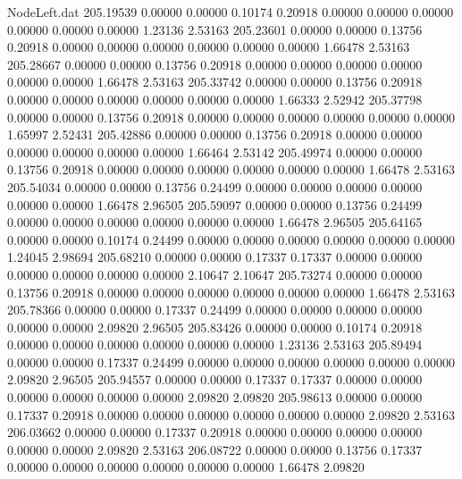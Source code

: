 \begin{filecontents}{NodeLeft.dat}
 205.19539    0.00000    0.00000     0.10174    0.20918    0.00000    0.00000    0.00000    0.00000    0.00000    0.00000    1.23136    2.53163
 205.23601    0.00000    0.00000     0.13756    0.20918    0.00000    0.00000    0.00000    0.00000    0.00000    0.00000    1.66478    2.53163
 205.28667    0.00000    0.00000     0.13756    0.20918    0.00000    0.00000    0.00000    0.00000    0.00000    0.00000    1.66478    2.53163
 205.33742    0.00000    0.00000     0.13756    0.20918    0.00000    0.00000    0.00000    0.00000    0.00000    0.00000    1.66333    2.52942
 205.37798    0.00000    0.00000     0.13756    0.20918    0.00000    0.00000    0.00000    0.00000    0.00000    0.00000    1.65997    2.52431
 205.42886    0.00000    0.00000     0.13756    0.20918    0.00000    0.00000    0.00000    0.00000    0.00000    0.00000    1.66464    2.53142
 205.49974    0.00000    0.00000     0.13756    0.20918    0.00000    0.00000    0.00000    0.00000    0.00000    0.00000    1.66478    2.53163
 205.54034    0.00000    0.00000     0.13756    0.24499    0.00000    0.00000    0.00000    0.00000    0.00000    0.00000    1.66478    2.96505
 205.59097    0.00000    0.00000     0.13756    0.24499    0.00000    0.00000    0.00000    0.00000    0.00000    0.00000    1.66478    2.96505
 205.64165    0.00000    0.00000     0.10174    0.24499    0.00000    0.00000    0.00000    0.00000    0.00000    0.00000    1.24045    2.98694
 205.68210    0.00000    0.00000     0.17337    0.17337    0.00000    0.00000    0.00000    0.00000    0.00000    0.00000    2.10647    2.10647
 205.73274    0.00000    0.00000     0.13756    0.20918    0.00000    0.00000    0.00000    0.00000    0.00000    0.00000    1.66478    2.53163
 205.78366    0.00000    0.00000     0.17337    0.24499    0.00000    0.00000    0.00000    0.00000    0.00000    0.00000    2.09820    2.96505
 205.83426    0.00000    0.00000     0.10174    0.20918    0.00000    0.00000    0.00000    0.00000    0.00000    0.00000    1.23136    2.53163
 205.89494    0.00000    0.00000     0.17337    0.24499    0.00000    0.00000    0.00000    0.00000    0.00000    0.00000    2.09820    2.96505
 205.94557    0.00000    0.00000     0.17337    0.17337    0.00000    0.00000    0.00000    0.00000    0.00000    0.00000    2.09820    2.09820
 205.98613    0.00000    0.00000     0.17337    0.20918    0.00000    0.00000    0.00000    0.00000    0.00000    0.00000    2.09820    2.53163
 206.03662    0.00000    0.00000     0.17337    0.20918    0.00000    0.00000    0.00000    0.00000    0.00000    0.00000    2.09820    2.53163
 206.08722    0.00000    0.00000     0.13756    0.17337    0.00000    0.00000    0.00000    0.00000    0.00000    0.00000    1.66478    2.09820

\end{filecontents}
